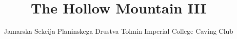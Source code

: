 \documentclass[symmetric, a4paper]{tufte-book}
\title{The Hollow Mountain III}
\author{Jamarska Sekcija Planinskega Drustva Tolmin Imperial College Caving Club}
\begin{document}
\maketitle %

\justify

\tableofcontents %

\newpage




	

	
  	
	
 	
	
	
	

	
	
    \printindex
    \printindex[aut]

   
    
	\label{Bibliography}
	
	
	

	
\end{document}
